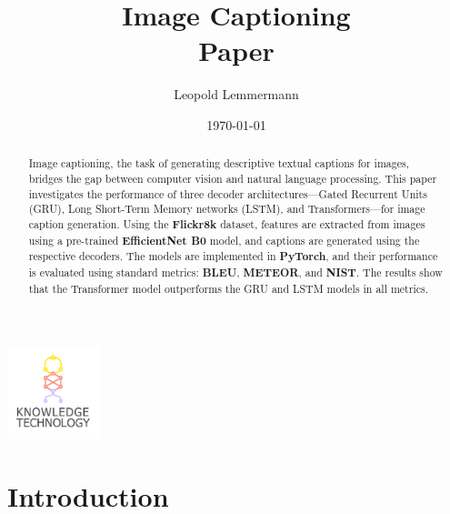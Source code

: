 \documentclass[12pt]{article}
\newcommand{\trauthor}{Leopold Lemmermann}
\newcommand{\trtype}{Paper}
\newcommand{\trtitle}{Image Captioning}
\newcommand{\trdate}{\today}
\theoremstyle{plain}
\theoremstyle{definition}
\theoremstyle{remark}
\begin{document}
\renewcommand{\headheight}{14.5pt}

\fancyhead{}
\fancyhead[CO]{\trtitle}



\title{\trtitle\\[0.2cm]{\normalsize\trtype}}
\author{\trauthor}
\date{\trdate}
\maketitle

\thispagestyle{empty}

\begin{center}
    \includegraphics[width=0.2\textwidth]{res/wtmicon.pdf}
\end{center}

\begin{abstract}
    Image captioning, the task of generating descriptive textual captions for images, bridges the gap between computer vision and natural language processing.
    This paper investigates the performance of three decoder architectures---Gated Recurrent Units (GRU), Long Short-Term Memory networks (LSTM), and Transformers---for image caption generation.
    Using the \textbf{Flickr8k} dataset, features are extracted from images using a pre-trained \textbf{EfficientNet B0} model, and captions are generated using the respective decoders.
    The models are implemented in \textbf{PyTorch}, and their performance is evaluated using standard metrics: \textbf{BLEU}, \textbf{METEOR}, and \textbf{NIST}.
    The results show that the Transformer model outperforms the GRU and LSTM models in all metrics.
\end{abstract}

\setcounter{tocdepth}{1}
\tableofcontents
\newpage
{}



\section{Introduction}
\label{sec:introduction}
\end{document}
